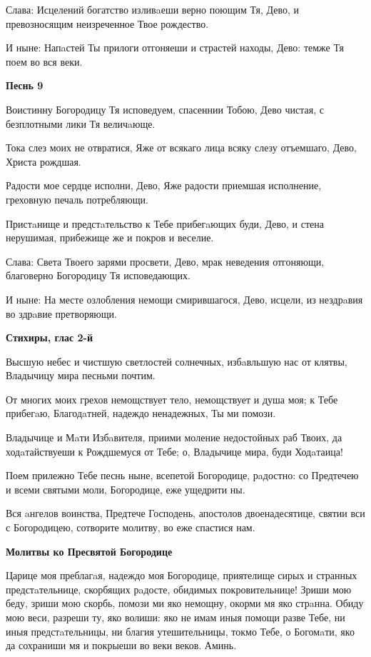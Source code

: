Слава: Исцелений богатство изливaеши верно поющим Тя, Дево, и превозносящим неизреченное Твое рождество.

И ныне: Напaстей Ты прилоги отгоняеши и страстей находы, Дево: темже Тя поем во вся веки.


\medskip
\bfseries Песнь 9\normalfont{}

Воистинну Богородицу Тя исповедуем, спасеннии Тобою, Дево чистая, с безплотными лики Тя величaюще.

Тока слез моих не отвратися, Яже от всякаго лица всяку слезу отъемшаго, Дево, Христа рождшая.

Радости мое сердце исполни, Дево, Яже радости приемшая исполнение, греховную печаль потребляющи.


Пристaнище и предстaтельство к Тебе прибегaющих буди, Дево, и стена нерушимая, прибежище же и покров и веселие.

Слава: Света Твоего зарями просвети, Дево, мрак неведения отгоняющи, благоверно Богородицу Тя исповедающих.

И ныне: На месте озлобления немощи смирившагося, Дево, исцели, из нездрaвия во здрaвие претворяющи.


\medskip
\bfseries Стихиры, глас 2-й\normalfont{}

Высшую небес и чистшую светлостей солнечных, избaвльшую нас от клятвы, Владычицу мира песньми почтим.

От многих моих грехов немощствует тело, немощствует и душа моя; к Тебе прибегaю, Благодaтней, надеждо ненадежных, Ты ми помози.

Владычице и Мaти Избaвителя, приими моление недостойных раб Твоих, да ходaтайствуеши к Рождшемуся от Тебе; о, Владычице мира, буди Ходaтаица!

Поем прилежно Тебе песнь ныне, всепетой Богородице, рaдостно: со Предтечею и всеми святыми моли, Богородице, еже ущедрити ны.

Вся aнгелов воинства, Предтече Господень, апостолов двоенадесятице, святии вси с Богородицею, сотворите молитву, во еже спастися нам.


\medskip
\bfseries Молитвы ко Пресвятой Богородице\normalfont{}


Царице моя преблагaя, надеждо моя Богородице, приятелище сирых и странных предстaтельнице, скорбящих рaдосте, обидимых покровительнице! Зриши мою беду, зриши мою скорбь, помози ми яко немощну, окорми мя яко стрaнна. Обиду мою веси, разреши ту, яко волиши: яко не имам иныя помощи разве Тебе, ни иныя предстaтельницы, ни благия утешительницы, токмо Тебе, о Богомaти, яко да сохраниши мя и покрыеши во веки веков. Аминь.


